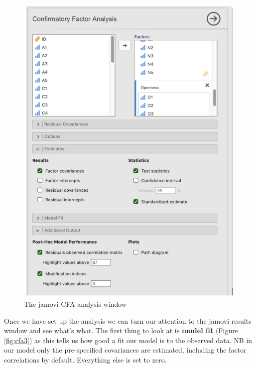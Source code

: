 \documentclass[
]{book}
\begin{document}
\begin{figure}

{\centering \includegraphics[width=1\linewidth]{img/factoranalysis/cfa2} 

}

\caption{The jamovi CFA analysis window}\label{fig:cfa2}
\end{figure}

Once we have set up the analysis we can turn our attention to the jamovi results window and see what's what. The first thing to look at is {\textbf{model fit}} (Figure \ref{fig:cfa3}) as this tells us how good a fit our model is to the observed data. NB in our model only the pre-specified covariances are estimated, including the factor correlations by default. Everything else is set to zero.
\end{document}
